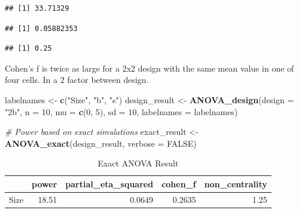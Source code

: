 \documentclass[]{book}
\newenvironment{Shaded}{\begin{snugshade}}{\end{snugshade}}
\newcommand{\CommentTok}[1]{\textcolor[rgb]{0.56,0.35,0.01}{\textit{#1}}}
\newcommand{\DataTypeTok}[1]{\textcolor[rgb]{0.13,0.29,0.53}{#1}}
\newcommand{\DecValTok}[1]{\textcolor[rgb]{0.00,0.00,0.81}{#1}}
\newcommand{\KeywordTok}[1]{\textcolor[rgb]{0.13,0.29,0.53}{\textbf{#1}}}
\newcommand{\NormalTok}[1]{#1}
\newcommand{\OperatorTok}[1]{\textcolor[rgb]{0.81,0.36,0.00}{\textbf{#1}}}
\newcommand{\OtherTok}[1]{\textcolor[rgb]{0.56,0.35,0.01}{#1}}
\newcommand{\StringTok}[1]{\textcolor[rgb]{0.31,0.60,0.02}{#1}}
\begin{document}
\begin{verbatim}
## [1] 33.71329
\end{verbatim}

\begin{Shaded}
\end{Shaded}

\begin{verbatim}
## [1] 0.05882353
\end{verbatim}

\begin{Shaded}
\end{Shaded}

\begin{verbatim}
## [1] 0.25
\end{verbatim}

Cohen's f is twice as large for a 2x2 design with the same mean value in one of four cells. In a 2 factor between design.

\begin{Shaded}
\begin{Highlighting}[]
\NormalTok{labelnames <-}\StringTok{ }\KeywordTok{c}\NormalTok{(}\StringTok{"Size"}\NormalTok{, }\StringTok{"b"}\NormalTok{, }\StringTok{"s"}\NormalTok{)}
\NormalTok{design_result <-}\StringTok{ }\KeywordTok{ANOVA_design}\NormalTok{(}\DataTypeTok{design =} \StringTok{"2b"}\NormalTok{, }
                              \DataTypeTok{n =} \DecValTok{10}\NormalTok{,  }
                              \DataTypeTok{mu =} \KeywordTok{c}\NormalTok{(}\DecValTok{0}\NormalTok{, }\DecValTok{5}\NormalTok{), }
                              \DataTypeTok{sd =} \DecValTok{10}\NormalTok{, }
                              \DataTypeTok{labelnames =}\NormalTok{ labelnames) }

\CommentTok{# Power based on exact simulations}
\NormalTok{exact_result <-}\StringTok{ }\KeywordTok{ANOVA_exact}\NormalTok{(design_result,}
                            \DataTypeTok{verbose =} \OtherTok{FALSE}\NormalTok{)}
\end{Highlighting}
\end{Shaded}

\begin{table}[t]

\caption{\label{tab:unnamed-chunk-201}Exact ANOVA Result}
\centering
\begin{tabular}{l|r|r|r|r}
\hline
  & power & partial\_eta\_squared & cohen\_f & non\_centrality\\
\hline
Size & 18.51 & 0.0649 & 0.2635 & 1.25\\
\hline
\end{tabular}
\end{table}
\end{document}
